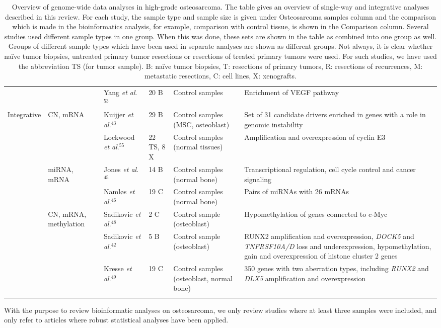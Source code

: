 {{\begin{landscape}
\begin{singlespacing}
\begin{longtable}[c]{|>{\raggedright}p{0.7in} >{\raggedright}p{0.6in} >{\raggedright}p{1.35in} >{\raggedright}p{1.2in} >{\raggedright}p{2.0in} >{\raggedright}p{3.0in}|}
		& & Yang {\it et al}.$^{53}$ & 20 B & Control samples & Enrichment of VEGF pathway\tabularnewline
		Integrative & CN, mRNA & Kuijjer {\it et al}.$^{43}$ & 29 B & Control samples (MSC, osteoblast) & Set of 31 candidate drivers enriched in genes with a role in genomic instability\tabularnewline
		& & Lockwood {\it et al}.$^{55}$ & 22 TS, 8 X & Control samples (normal tissues) & Amplification and overexpression of cyclin E3\tabularnewline
		& miRNA, mRNA & Jones {\it et al}.$^{45}$ & 14 B & Control samples (normal bone) & Transcriptional regulation, cell cycle control and cancer signaling\tabularnewline
		& & Naml{\o}s {\it et al}.$^{46}$ & 19 C & Control samples (normal bone) & Pairs of miRNAs with 26 mRNAs\tabularnewline
		& CN, mRNA, methylation & Sadikovic {\it et al}.$^{48}$ & 2 C & Control sample (osteoblast) & Hypomethylation of genes connected to c-Myc\tabularnewline
		& & Sadikovic {\it et al}.$^{42}$ & 5 B & Control sample (osteoblast) & RUNX2 amplification and overexpression, {\it DOCK5} and {\it TNFRSF10A/D} loss and underexpression, hypomethylation, gain and overexpression of histone cluster 2 genes\tabularnewline
		& & Kresse {\it et al}.$^{49}$ & 19 C & Control samples (osteoblast, normal bone) & 350 genes with two aberration types, including {\it RUNX2} and {\it DLX5} amplification and overexpression\tabularnewline
		\hline
		\caption{Overview of genome\hyp{}wide data analyses in high\hyp{}grade osteosarcoma. The table gives an overview of single\hyp{}way and integrative analyses described in this review. For each study, the sample type and sample size is given under Osteosarcoma samples column and the comparison which is made in the bioinformatics analysis, for example, comparison with control tissue, is shown in the Comparison column. Several studies used different sample types in one group. When this was done, these sets are shown in the table as combined into one group as well. Groups of different sample types which have been used in separate analyses are shown as different groups. Not always, it is clear whether na{\"i}ve tumor biopsies, untreated primary tumor resections or resections of treated primary tumors were used. For such studies, we have used the abbreviation TS (for tumor sample). B: na{\"i}ve tumor biopsies, T: resections of primary tumors, R: resections of recurrences, M: metastatic resections, C: cell lines, X: xenografts.}
		\label{tab2.1}
		\end{longtable}
	\end{singlespacing}
\end{landscape}
}
}
%
With the
purpose to review bioinformatic analyses on osteosarcoma,
we only review studies where at least three samples were
included, and only refer to articles where robust statistical
analyses have been applied.

